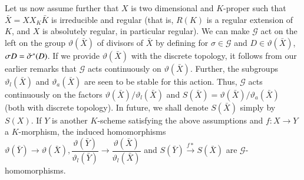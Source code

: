 Let us now assume further that $X$ is two dimensional and $K$-proper
such that $\bar{X} = X X_K \bar{K}$ is irreducible and regular (that
is, $R(K)$ is a regular extension of $K$, and $X$ is absolutely
regular, in particular regular). We can make $\mathscr{G}$ act on the
left on the group $\vartheta(\bar{X})$ of divisors of $\bar{X}$ by
defining for $\sigma \in \mathscr{G}$ and $D \in \vartheta (\bar{X})$,
$\sigma D =\check{\sigma}^* (D)$. If we provide $\vartheta(\bar{X})$
with the 
discrete topology, it follows from our earlier remarks that
$\mathscr{G}$ acts continuously on $\vartheta(\bar{X})$. Further, the
subgroups $\vartheta_l (\bar{X})$ and $\vartheta_a(\bar{X})$ are seen
to be stable for this action. Thus, $\mathscr{G}$ acts continuously on
the factors $\vartheta(\bar{X}) /  \vartheta_l (\bar{X})$ and
$S(\bar{X})=\vartheta(\bar{X})/\vartheta_a (\bar{X})$ (both with
discrete topology). In future, we shall denote $S(\bar{X})$ simply by
$S(X)$. If $Y$ is another $K$-scheme satisfying the above assumptions
and $f : X \to Y$ a $K$-morphism, the induced\pageoriginale
homomorphisms $\vartheta(\bar{Y}) \to \vartheta(\bar{X}), 
\dfrac{\vartheta(\bar{Y})}{\vartheta_l(\bar{Y})} \to
\dfrac{\vartheta(\bar{X})}{\vartheta_l(\bar{X})}$ and $S(\bar{Y})
\xrightarrow{f*} S(\bar{X})$ are $\mathscr{G}$-homomorphisms. 

